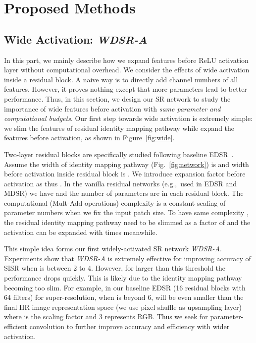 \documentclass{article}
\begin{document}
\section{Proposed Methods}
\subsection{Wide Activation: \textit{WDSR-A}}
In this part, we mainly describe how we expand features before ReLU activation layer without computational overhead. We consider the effects of wide activation inside a residual block. A naive way is to directly add channel numbers of all features. However, it proves nothing except that more parameters lead to better performance. Thus, in this section, we design our SR network to study the importance of wide features before activation with \textit{same parameter and computational budgets}. Our first step towards wide activation is extremely simple: we slim the features of residual identity mapping pathway while expand the features before activation, as shown in Figure~\ref{fig:wide}.

Two-layer residual blocks are specifically studied following baseline EDSR~\cite{lim2017enhanced}. Assume the width of identity mapping pathway (Fig.~\ref{fig:network}) is  and width before activation inside residual block is . We introduce expansion factor before activation as  thus . In the vanilla residual networks (e.g.,\ used in EDSR and MDSR) we have  and the number of parameters are  in each residual block. The computational (Mult-Add operations) complexity is a constant scaling of parameter numbers when we fix the input patch size. To have same complexity , the residual identity mapping pathway need to be slimmed as a factor of  and the activation can be expanded with  times meanwhile.

This simple idea forms our first widely-activated SR network \textit{WDSR-A}. Experiments show that \textit{WDSR-A} is extremely effective for improving accuracy of SISR when  is between 2 to 4. However, for  larger than this threshold the performance drops quickly. This is likely due to the identity mapping pathway becoming too slim. For example, in our baseline EDSR (16 residual blocks with 64 filters) for  super-resolution, when  is beyond 6,  will be even smaller than the final HR image representation space  (we use pixel shuffle as upsampling layer) where  is the scaling factor and 3 represents RGB. Thus we seek for parameter-efficient convolution to further improve accuracy and efficiency with wider activation.
\end{document}
